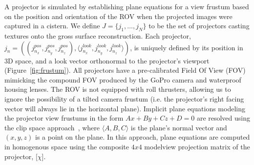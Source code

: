 \documentclass[twocolumn]{article}
\begin{document}
A projector is simulated by establishing plane equations for a view frustum based on the position and orientation of the ROV when the projected images were captured in a cistern. We define $J = \{j_{1},\dots,j_{N}\}$ to be the set of projectors casting textures onto the gross surface reconstruction. Each projector, $j_{n} = ((j_{n_{x}}^{pos},j_{n_{y}}^{pos},j_{n_{z}}^{pos}), \langle j_{n_{x}}^{look},j_{n_{y}}^{look},j_{n_{z}}^{look}\rangle)$, is uniquely defined by its position in 3D space, and a look vector orthonormal to the projector's viewport (Figure~\ref{fig:frustum}). All projectors have a pre-calibrated Field Of View (FOV) mimicking the compound FOV produced by the GoPro camera and waterproof housing lenses. The ROV is not equipped with roll thrusters, allowing us to ignore the possibility of a tilted camera frustum (i.e. the projector's right facing vector will always lie in the horizontal plane). Implicit plane equations modeling the projector view frustums in the form $Ax + By + Cz + D = 0$ are resolved using the clip space approach~\cite{vfc}, where $\langle A, B, C\rangle$ is the plane's normal vector and  $(x, y, z)$ is a point on the plane. In this approach, plane equations are computed in homogenous space using the composite $4x4$ modelview projection matrix of the projector, $\lbrack \chi \rbrack$.
\end{document}

